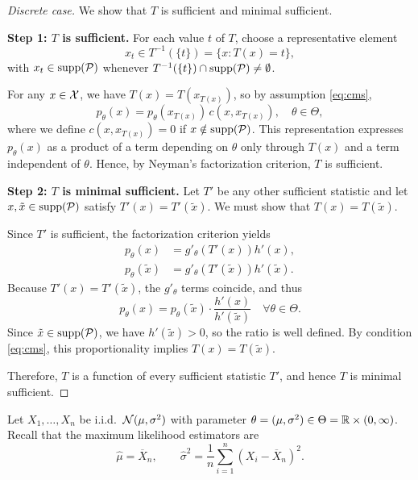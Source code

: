 \begin{proof}[Discrete case]
We show that $T$ is sufficient and minimal sufficient.

\medskip
\noindent
\textbf{Step 1: $T$ is sufficient.}
For each value $t$ of $T$, choose a representative element
\[
x_t \in T^{-1}(\{t\}) = \{ x : T(x) = t \},
\]
with $x_t \in \operatorname{supp}(\mathcal{P})$ whenever
$T^{-1}(\{t\}) \cap \operatorname{supp}(\mathcal{P}) \neq \emptyset$.

For any $x \in \mathcal{X}$, we have $T(x) = T(x_{T(x)})$, so by assumption \eqref{eq:cms},
\[
p_{\theta}(x) = p_{\theta}(x_{T(x)}) \, c(x,x_{T(x)}),
\quad \theta \in \Theta,
\]
where we define $c(x,x_{T(x)}) = 0$ if $x \notin \operatorname{supp}(\mathcal{P})$.
This representation expresses $p_{\theta}(x)$ as a product of a term depending on $\theta$
only through $T(x)$ and a term independent of $\theta$.
Hence, by Neyman's factorization criterion, $T$ is sufficient.

\medskip
\noindent
\textbf{Step 2: $T$ is minimal sufficient.}
Let $T'$ be any other sufficient statistic and let
$x,\tilde{x} \in \operatorname{supp}(\mathcal{P})$ satisfy $T'(x) = T'(\tilde{x})$.
We must show that $T(x) = T(\tilde{x})$.

Since $T'$ is sufficient, the factorization criterion yields
\begin{align*}
p_{\theta}(x) &= g'_{\theta}(T'(x)) h'(x), \\
p_{\theta}(\tilde{x}) &= g'_{\theta}(T'(\tilde{x})) h'(\tilde{x}).
\end{align*}
Because $T'(x) = T'(\tilde{x})$, the $g'_{\theta}$ terms coincide, and thus
\begin{equation}
\label{eq:ch3_fin}
p_{\theta}(x) = p_{\theta}(\tilde{x}) \cdot \frac{h'(x)}{h'(\tilde{x})}
\quad \forall \theta \in \Theta.
\end{equation}
Since $\tilde{x} \in \operatorname{supp}(\mathcal{P})$, we have $h'(\tilde{x}) > 0$, so the ratio is well defined.
By condition \eqref{eq:cms}, this proportionality implies $T(x) = T(\tilde{x})$.

Therefore, $T$ is a function of every sufficient statistic $T'$, and hence $T$ is minimal
sufficient.
\end{proof}

\begin{ex}
Let $X_1,\dots,X_n$ be i.i.d.\ $\mathcal{N}(\mu,\sigma^2)$ with parameter
$\theta = (\mu,\sigma^2) \in \Theta = \mathbb{R} \times (0,\infty)$.
Recall that the maximum likelihood estimators are
\[
\hat{\mu} = \overline{X}_n,
\qquad
\hat{\sigma}^2 = \frac{1}{n}\sum_{i=1}^n (X_i - \overline{X}_n)^2 .
\]
\end{ex}

